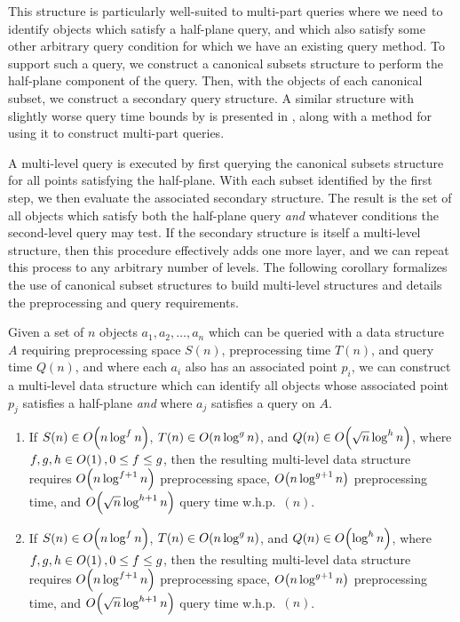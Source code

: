 This structure is particularly well-suited to multi-part queries where we need to identify objects which satisfy a half-plane query, and which also satisfy some other arbitrary query condition for which we have an existing query method.
To support such a query, we construct a canonical subsets structure to perform the half-plane component of the query. 
Then, with the objects of each canonical subset, we construct a secondary query structure.
A similar structure with slightly worse query time bounds by \cite{Matousek92} is presented in \cite[Chapter~16]{Deberg}, along with a method for using it to construct multi-part queries.

A multi-level query is executed by first querying the canonical subsets structure for all points satisfying the half-plane.
With each subset identified by the first step, we then evaluate the associated secondary structure.
The result is the set of all objects which satisfy both the half-plane query \emph{and} whatever conditions the second-level query may test.
If the secondary structure is itself a multi-level structure, then this procedure effectively adds one more layer, and we can repeat this process to any arbitrary number of levels.
The following corollary formalizes the use of canonical subset structures to build multi-level structures and details the preprocessing and query requirements.


\begin{corollary}
\label{cor:multichan}

Given a set of $n$ objects $a_1, a_2, \ldots, a_n$ which can be queried with a data structure $A$ requiring preprocessing space $S(n)$, preprocessing time $T(n)$, and query time $Q(n)$, and where each $a_i$ also has an associated point $p_i$, we can construct a multi-level data structure which can identify all objects whose associated point $p_j$ satisfies a half-plane  \emph{and} where $a_j$ satisfies a query on $A$.

\begin{enumerate}
\item If $S(n) \in O\!\left(n \log^f{n}\right)$, $T(n) \in O\!\left(n \log^g{n}\right)$, and $Q(n) \in O\!\left(\sqrt{n} \log^h{n}\right)$, where $f, g, h \in O\!\left(1\right), 0 \leq f \leq g$, then the resulting multi-level data structure requires $O\!\left(n\log^{f+1}{n}\right)$ preprocessing space, $O\!\left(n\log^{g+1}{n}\right)$ preprocessing time, and $O\!\left(\sqrt{n}\log^{h+1}{n}\right)$ query time w.h.p.~$(n)$.

\item If $S(n) \in O\!\left(n \log^f{n}\right)$, $T(n) \in O\!\left(n \log^g{n}\right)$, and $Q(n) \in O\!\left(\log^h{n}\right)$, where $f, g, h \in O\!\left(1\right), 0 \leq f \leq g$, then the resulting multi-level data structure requires $O\!\left(n\log^{f+1}{n}\right)$ preprocessing space, $O\!\left(n\log^{g+1}{n}\right)$ preprocessing time, and $O\!\left(\sqrt{n}\log^{h+1}{n}\right)$ query time w.h.p.~$(n)$.

\end{enumerate}
\end{corollary}

